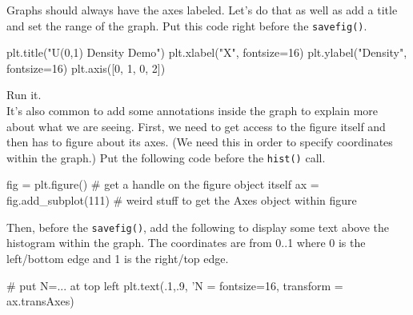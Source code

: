 \begin{fullwidth}

\step  Graphs should always have the axes labeled. Let's do that as well as add a title and set the range of the graph. Put this code right before the {\tt savefig()}.

\begin{pyverbatim}
plt.title("U(0,1) Density Demo")
plt.xlabel("X", fontsize=16)
plt.ylabel("Density", fontsize=16)
plt.axis([0, 1, 0, 2])
\end{pyverbatim}

\step Run it. \\

\step It's also common to add some annotations inside the graph to explain more about what we are seeing. First, we need to get access to the figure itself and then has to figure about its axes. (We need this in order to specify coordinates within the graph.) Put the following code before the {\tt hist()} call.

\begin{pyverbatim}
fig = plt.figure()        # get a handle on the figure object itself
ax = fig.add_subplot(111) # weird stuff to get the Axes object within figure
\end{pyverbatim}

Then, before the {\tt savefig()},  add the following to display some text above the histogram within the graph. The coordinates are from 0..1 where 0 is the left/bottom edge and 1 is the right/top edge.

\begin{pyverbatim}
# put N=... at top left
plt.text(.1,.9, 'N = %
		 fontsize=16,
		 transform = ax.transAxes) 
\end{pyverbatim}


\end{fullwidth}
